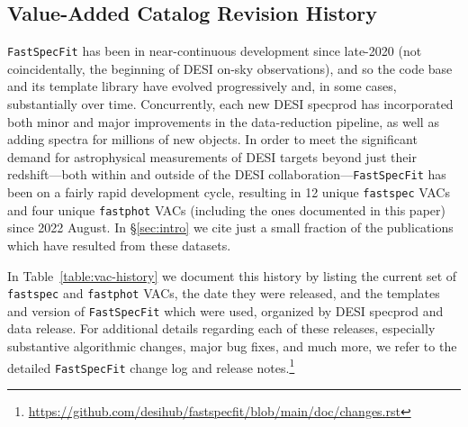 \documentclass[modern,linenumbers]{aastex701}
\newcommand{\todo}[1]{{\color{red}\textbf{TODO:} #1}}
\newcommand{\fastspecfit}{\texttt{FastSpecFit}}
\newcommand{\fastspec}{\texttt{fastspec}}
\newcommand{\fastphot}{\texttt{fastphot}}
\begin{document}
\begin{appendix}
\section{Value-Added Catalog Revision History}
\label{sec:appendix_vacs}

\fastspecfit{} has been in near-continuous development since late-2020
(not coincidentally, the beginning of DESI on-sky observations), and
so the code base and its template library have evolved progressively
and, in some cases, substantially over time. Concurrently, each new
DESI specprod has incorporated both minor and major improvements in
the data-reduction pipeline, as well as adding spectra for millions of
new objects. In order to meet the significant demand for astrophysical
measurements of DESI targets beyond just their redshift---both within
and outside of the DESI collaboration---\fastspecfit{} has been on a
fairly rapid development cycle, resulting in 12 unique \fastspec{}
VACs and four unique \fastphot{} VACs (including the ones documented
in this paper) since 2022 August. In \S\ref{sec:intro} we cite just a
small fraction of the publications which have resulted from these
datasets.

In Table~\ref{table:vac-history} we document this history by listing
the current set of \fastspec{} and \fastphot{} VACs, the date they
were released, and the templates and version of \fastspecfit{} which
were used, organized by DESI specprod and data release. For additional
details regarding each of these releases, especially substantive
algorithmic changes, major bug fixes, and much more, we refer to the
detailed \fastspecfit{} change log and release
notes.\footnote{\url{https://github.com/desihub/fastspecfit/blob/main/doc/changes.rst}}





\end{appendix}
\end{document}

